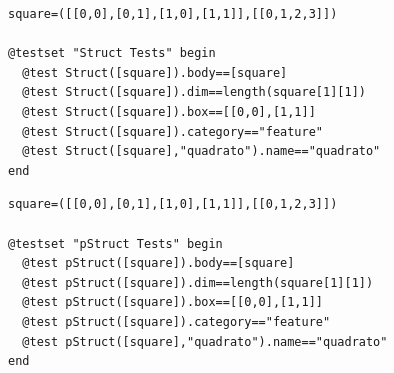 \documentclass[a4paper,12pt]{article}
\begin{document}
\begin{Verbatim}[fontsize=\footnotesize]
square=([[0,0],[0,1],[1,0],[1,1]],[[0,1,2,3]])

@testset "Struct Tests" begin
  @test Struct([square]).body==[square]
  @test Struct([square]).dim==length(square[1][1])
  @test Struct([square]).box==[[0,0],[1,1]]
  @test Struct([square]).category=="feature"
  @test Struct([square],"quadrato").name=="quadrato"
end

\end{Verbatim}
\begin{Verbatim}[fontsize=\footnotesize]
square=([[0,0],[0,1],[1,0],[1,1]],[[0,1,2,3]])

@testset "pStruct Tests" begin
  @test pStruct([square]).body==[square]
  @test pStruct([square]).dim==length(square[1][1])
  @test pStruct([square]).box==[[0,0],[1,1]]
  @test pStruct([square]).category=="feature"
  @test pStruct([square],"quadrato").name=="quadrato"
end

\end{Verbatim}
\end{document}
